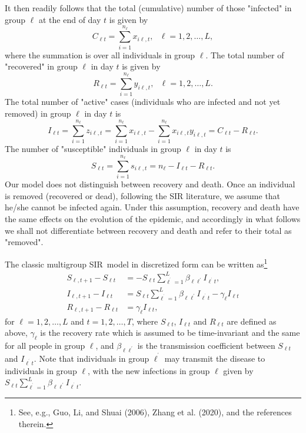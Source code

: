 \documentclass[12pt]{article}
\begin{document}
It then readily follows that the total (cumulative) number of those "infected"
in group $\ell$ at the end of day $t$ is given by%
\begin{equation}
C_{\ell t}=\sum_{i=1}^{n_{\ell}}x_{i\ell,t},\text{ }\ell=1,2,\ldots,L,
\label{Cl}%
\end{equation}
where the summation is over all individuals in group $\ell$. The total number
of "recovered" in group $\ell$ in day $t$ is given by%
\begin{equation}
R_{\ell t}=\sum_{i=1}^{n_{\ell}}y_{i\ell,t},\text{ }\ell=1,2,\ldots,L.
\label{Rl}%
\end{equation}
The total number of "active" cases (individuals who are infected and not yet
removed) in group $\ell$ in day $t$ is
\begin{equation}
I_{\ell t}=\sum_{i=1}^{n_{\ell}}z_{i\ell,t}=\sum_{i=1}^{n_{\ell}}x_{i\ell
,t}-\sum_{i=1}^{n_{\ell}}x_{i\ell,t}y_{i\ell,t}=C_{\ell t}-R_{\ell t}.
\label{Il}%
\end{equation}
The number of "susceptible" individuals in group $\ell$ in day $t$ is%
\begin{equation}
S_{\ell t}=\sum_{i=1}^{n_{\ell}}s_{i\ell,t}=n_{\ell}-I_{\ell t}-R_{\ell
t}\text{.} \label{Sl}%
\end{equation}
Our model does not distinguish between recovery and death. Once an individual
is removed (recovered or dead), following the SIR literature, we assume that
he/she cannot be infected again. Under this assumption, recovery and death
have the same effects on the evolution of the epidemic, and accordingly in
what follows we shall not differentiate between recovery and death and refer
to their total as "removed".

The classic multigroup SIR\ model in discretized form can be written
as\footnote{See, e.g., Guo, Li, and Shuai (2006), Zhang et al. (2020), and the
references therein.}%
\begin{align}
S_{\ell,t+1}-S_{\ell t}  &  =-S_{\ell t}\sum_{\ell^{^{\prime}}=1}^{L}%
\beta_{\ell\ell^{\prime}}I_{\ell^{^{\prime}}t},\label{SIR-S}\\
I_{\ell,t+1}-I_{\ell t}  &  =S_{\ell t}\sum_{\ell^{^{\prime}}=1}^{L}%
\beta_{\ell\ell^{\prime}}I_{\ell^{^{\prime}}t}-\gamma_{\ell}I_{\ell
t}\label{SIR-I}\\
R_{\ell,t+1}-R_{\ell t}  &  =\gamma_{\ell}I_{\ell t}, \label{SIR-R}%
\end{align}
for $\ell=1,2,\ldots,L$ and $t=1,2,\ldots,T$, where $S_{\ell t}$, $I_{\ell t}$
and $R_{\ell t}$ are defined as above, $\gamma_{\ell}$ is the recovery rate
which is assumed to be time-invariant and the same for all people in group
$\ell$, and $\beta_{\ell\ell^{\prime}}$ is the transmission coefficient
between $S_{\ell t}$ and $I_{\ell^{^{\prime}}t}$. Note that individuals in
group $\ell^{^{\prime}}$ may transmit the disease to individuals in group
$\ell$, with the new infections in group $\ell$ given by $S_{\ell t}\sum
_{\ell^{^{\prime}}=1}^{L}\beta_{\ell\ell^{\prime}}I_{\ell^{^{\prime}}t}$.
\end{document}

